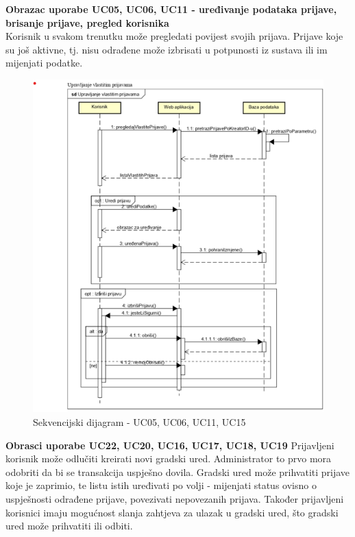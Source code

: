 				\textbf{Obrazac uporabe UC05, UC06, UC11 - uređivanje podataka prijave, brisanje prijave, pregled korisnika}\\
				Korisnik u svakom trenutku može pregledati povijest svojih prijava. Prijave koje su još aktivne, tj. nisu odrađene može izbrisati u potpunosti iz sustava ili im mijenjati podatke.
				
				\begin{figure}[H]
			\includegraphics[scale=1.0]{slike/upravljanje.PNG} %
			\centering
			\caption{Sekvencijski dijagram - UC05, UC06, UC11, UC15}
		\end{figure}
		
				
				\textbf{Obrasci uporabe UC22, UC20, UC16, UC17, UC18, UC19} Prijavljeni korisnik može odlučiti kreirati novi gradski ured. Administrator to prvo mora odobriti da bi se transakcija uspješno dovila. Gradski ured može prihvatiti prijave koje je zaprimio, te listu istih uređivati po volji - mijenjati status ovisno o uspješnosti odrađene prijave, povezivati nepovezanih prijava. Također prijavljeni korisnici imaju mogućnost slanja zahtjeva za ulazak u gradski ured, što gradski ured može prihvatiti ili odbiti.
			
